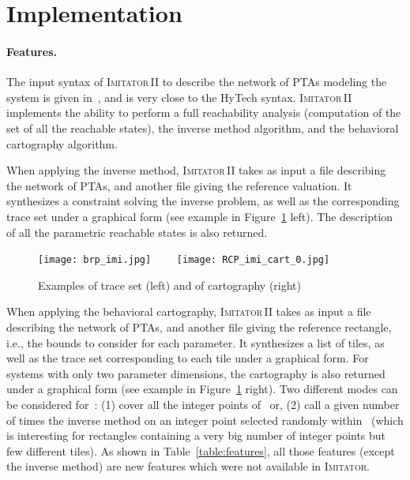 \documentclass[submission,copyright,creativecommons]{eptcs}
\newcommand{\hytech}{{\sc HyTech}}
\newcommand{\imitator}{\textsc{Imitator}}
\newcommand{\imitatordeux}{\textsc{Imitator}\,II}
\newcommand{\paragraphe}[1]{\paragraph{#1.}}
\begin{document}
\section{Implementation} \label{sec:implementation}


\paragraphe{Features}


The input syntax of \imitatordeux{} to describe the network of PTAs modeling the system is given in~\cite{imitator2_web}, and is very close to the \hytech{} syntax.
\imitatordeux{} implements the ability to perform a full reachability analysis (computation of the set of all the reachable states), the inverse method algorithm, and the behavioral cartography algorithm.

When applying the inverse method, \imitatordeux{} takes as input a file describing the network of PTAs, and another file giving the reference valuation.
It synthesizes a constraint solving the inverse problem, as well as the corresponding trace set under a graphical form (see example in Figure~\ref{fig:graphical_outputs} left).
The description of all the parametric reachable states is also returned.


\begin{figure}[ht!]
\centering
	\texttt{[image: brp\_imi.jpg]}
	\ \ \ \
	\texttt{[image: RCP\_imi\_cart\_0.jpg]}
\caption{Examples of trace set (left) and of cartography (right)}
\label{fig:graphical_outputs}
\end{figure}


When applying the behavioral cartography, \imitatordeux{} takes as input a file describing the network of PTAs, and another file giving the reference rectangle, i.e., the bounds to consider for each parameter.
It synthesizes a list of tiles, as well as the trace set corresponding to each tile under a graphical form.
For systems with only two parameter dimensions, the cartography is also returned under a graphical form (see example in Figure~\ref{fig:graphical_outputs} right).
Two different modes can be considered for~: (1) cover all the integer points of~ or, (2) call a given number of times the inverse method on an integer point selected randomly within~ (which is interesting for rectangles containing a very big number of integer points but few different tiles).
As shown in Table~\ref{table:features}, all those features (except the inverse method) are new features which were not available in \imitator{}.

\label{ss:features}
\end{document}
